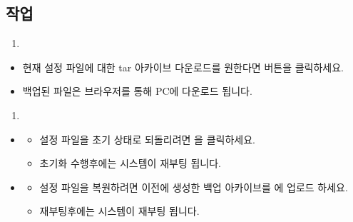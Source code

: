 \documentclass[letterpaper,10pt,english]{sphinxmanual}
\begin{document}
\subsection{작업}
\label{\detokenize{main_menu/system:id10}}\begin{enumerate}
%
\item {} 
\sphinxAtStartPar
{}

\end{enumerate}
\begin{itemize}
\item {} 
\sphinxAtStartPar
현재 설정 파일에 대한 tar 아카이브 다운로드를 원한다면  버튼을 클릭하세요.

\item {} 
\sphinxAtStartPar
백업된 파일은 브라우저를 통해 PC에 다운로드 됩니다.

\end{itemize}
\begin{enumerate}
%
\setcounter{enumi}{1}
\item {} 
\sphinxAtStartPar
{}

\end{enumerate}
\begin{itemize}
\item {} \begin{description}
\begin{itemize}
\item {} 
\sphinxAtStartPar
설정 파일을 초기 상태로 되돌리려면  을 클릭하세요.

\item {} 
\sphinxAtStartPar
초기화 수행후에는 시스템이 재부팅 됩니다.

\end{itemize}

\end{description}

\item {} \begin{description}
\begin{itemize}
\item {} 
\sphinxAtStartPar
설정 파일을 복원하려면 이전에 생성한 백업 아카이브를  에 업로드 하세요.

\item {} 
\sphinxAtStartPar
재부팅후에는 시스템이 재부팅 됩니다.

\end{itemize}

\end{description}

\end{itemize}
\end{document}

